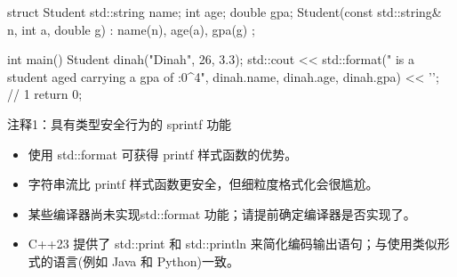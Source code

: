 
\begin{cpp}
struct Student {
  std::string name;
  int age;
  double gpa;
  Student(const std::string& n, int a, double g) : name(n), age(a), gpa(g) {}
};

int main() {
  Student dinah("Dinah", 26, 3.3);
  std::cout << std::format("{} is a student aged {} carrying a gpa of {:0^4}", dinah.name, dinah.age, dinah.gpa) << '\n'; // 1
  return 0;
}
\end{cpp}

{\footnotesize
注释1：具有类型安全行为的 sprintf 功能
}


\begin{itemize}
\item
使用 std::format 可获得 printf 样式函数的优势。

\item
字符串流比 printf 样式函数更安全，但细粒度格式化会很尴尬。

\item
某些编译器尚未实现std::format 功能；请提前确定编译器是否实现了。

\item
C++23 提供了 std::print 和 std::println 来简化编码输出语句；与使用类似形式的语言(例如 Java 和 Python)一致。
\end{itemize}








